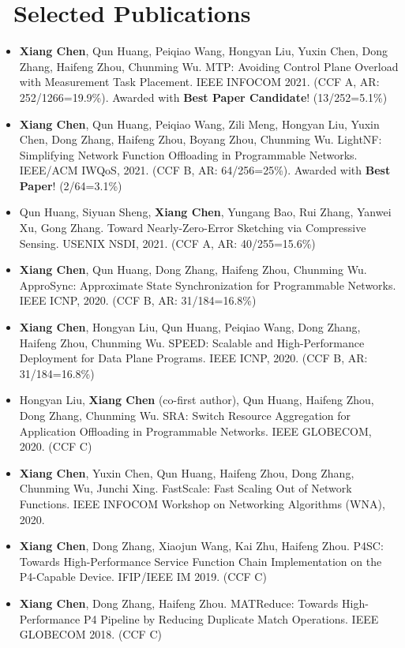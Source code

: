 \documentclass{resume}
\begin{document}
\section{\faBook\ Selected Publications}
\begin{itemize}[parsep=0.5ex]
  \item \textbf{Xiang Chen}, Qun Huang, Peiqiao Wang, Hongyan Liu, Yuxin Chen, Dong Zhang, Haifeng Zhou, Chunming Wu. MTP: Avoiding Control Plane Overload with Measurement Task Placement. IEEE INFOCOM 2021. (CCF A, AR: 252/1266=19.9\%). Awarded with \textbf{Best Paper Candidate}! (13/252=5.1\%)
  \item \textbf{Xiang Chen}, Qun Huang, Peiqiao Wang, Zili Meng, Hongyan Liu, Yuxin Chen, Dong Zhang, Haifeng Zhou, Boyang Zhou, Chunming Wu. LightNF: Simplifying Network Function Offloading in Programmable Networks. IEEE/ACM IWQoS, 2021. (CCF B, AR: 64/256=25\%). Awarded with \textbf{Best Paper}! (2/64=3.1\%)
  \item Qun Huang, Siyuan Sheng, \textbf{Xiang Chen}, Yungang Bao, Rui Zhang, Yanwei Xu, Gong Zhang. Toward Nearly-Zero-Error Sketching via Compressive Sensing. USENIX NSDI, 2021. (CCF A, AR: 40/255=15.6\%)
  \item \textbf{Xiang Chen}, Qun Huang, Dong Zhang, Haifeng Zhou, Chunming Wu. ApproSync: Approximate State Synchronization for Programmable Networks. IEEE ICNP, 2020. (CCF B, AR: 31/184=16.8\%)
  \item \textbf{Xiang Chen}, Hongyan Liu, Qun Huang, Peiqiao Wang, Dong Zhang, Haifeng Zhou, Chunming Wu. SPEED: Scalable and High-Performance Deployment for Data Plane Programs. IEEE ICNP, 2020. (CCF B, AR: 31/184=16.8\%)
  \item Hongyan Liu, \textbf{Xiang Chen} (co-first author), Qun Huang, Haifeng Zhou, Dong Zhang, Chunming Wu. SRA: Switch Resource Aggregation for Application Offloading in Programmable Networks. IEEE GLOBECOM, 2020. (CCF C)
  \item \textbf{Xiang Chen}, Yuxin Chen, Qun Huang, Haifeng Zhou, Dong Zhang, Chunming Wu, Junchi Xing. FastScale: Fast Scaling Out of Network Functions. IEEE INFOCOM Workshop on Networking Algorithms (WNA), 2020.
  \item \textbf{Xiang Chen}, Dong Zhang, Xiaojun Wang, Kai Zhu, Haifeng Zhou. P4SC: Towards High-Performance Service Function Chain Implementation on the P4-Capable Device. IFIP/IEEE IM 2019. (CCF C)
  \item \textbf{Xiang Chen}, Dong Zhang, Haifeng Zhou. MATReduce: Towards High-Performance P4 Pipeline by Reducing Duplicate Match Operations. IEEE GLOBECOM 2018. (CCF C)
\end{itemize}

%
%
\end{document}

